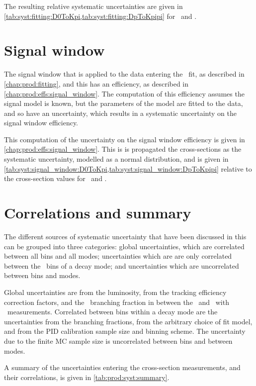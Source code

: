 The resulting relative systematic uncertainties are given in 
\cref{tab:syst:fitting:D0ToKpi,tab:syst:fitting:DpToKpipi} for \DzToKpi\ and 
\DpToKpipi.

\section{Signal window}
\label{chap:prod:syst:signal_window}

The signal window that is applied to the data entering the \lnipchisq\ fit, as 
described in \cref{chap:prod:fitting}, and this has an efficiency, as 
described in \cref{chap:prod:effs:signal_window}.
The computation of this efficiency assumes the signal model is known, but the 
parameters of the model are fitted to the data, and so have an uncertainty, 
which results in a systematic uncertainty on the signal window efficiency.

This computation of the uncertainty on the signal window efficiency is given in
\cref{chap:prod:effs:signal_window}.
This is is propagated the cross-sections as the systematic uncertainty, 
modelled as a normal distribution, and is given in 
\cref{tab:syst:signal_window:D0ToKpi,tab:syst:signal_window:DpToKpipi} relative 
to the cross-section values for \DzToKpi\ and \DpToKpipi.

\section{Correlations and summary}
\label{chap:prod:syst:correlations}

The different sources of systematic uncertainty that have been discussed in 
this  can be grouped into three categories:
global uncertainties, which are correlated between all bins and all modes; 
uncertainties which are are only correlated
between the \pTy\ bins of a decay mode; and uncertainties which are 
uncorrelated between bins and modes.

Global uncertainties are from the luminosity, from the tracking efficiency 
correction factors, and the \DzToKpi\ branching fraction in between the 
\DzToKpi\ and \DstToDzpi\ with \DzToKpi\ measurements.
Correlated between bins within a decay mode are the uncertainties from the 
branching fractions, from the arbitrary choice of fit model, and from the 
\ac{PID} calibration sample size and binning scheme.
The uncertainty due to the finite \ac{MC} sample size is uncorrelated between 
bins and between modes.

A summary of the uncertainties entering the cross-section measurements, and 
their correlations, is given in \cref{tab:prod:syst:summary}.

